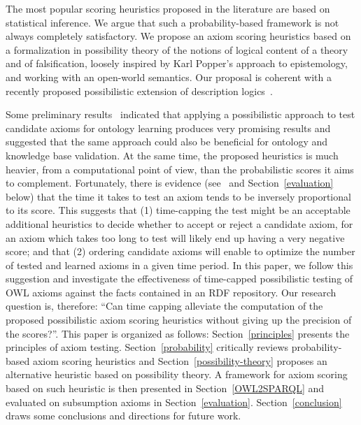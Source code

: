 \documentclass[conference]{IEEEtran}
\begin{document}
The most popular scoring heuristics proposed in the literature are based on statistical inference.
We argue that such a probability-based framework is not always completely satisfactory.
We propose an axiom scoring heuristics based on a formalization in possibility theory of
the notions of logical content of a theory and of falsification, loosely inspired
by Karl Popper's approach to epistemology, and working with an open-world semantics.
Our proposal is coherent with a recently proposed possibilistic extension of
description logics~\cite{QiPanJi2011,QiJiPanDu2010}.

Some preliminary results~\cite{TettamanziFaronZuckerGandon2014ekaw} indicated that
applying a possibilistic approach to test candidate axioms
for ontology learning produces very promising results and suggested that the same approach
could also be beneficial for ontology and knowledge base validation.
At the same time, the proposed heuristics is much heavier, from a computational
point of view, than the probabilistic scores it aims to complement.
Fortunately, there is evidence (see~\cite{TettamanziFaronZuckerGandon2014ekaw} and
Section~\ref{evaluation} below) that the time it takes to test an axiom
tends to be inversely proportional to its score.
This suggests that (1) time-capping the test might be an acceptable additional heuristics
to decide whether to accept or reject a candidate axiom, for an axiom which takes
too long to test will likely end up having a very negative score; and that (2) ordering candidate axioms will enable to optimize the number of tested and learned axioms in a given time period.
In this paper, we follow this suggestion and investigate the effectiveness
of time-capped possibilistic testing of OWL axioms against the facts contained
in an RDF repository.
Our research question is, therefore: ``Can time capping alleviate the computation
of the proposed possibilistic axiom scoring heuristics without giving up
the precision of the scores?''.
This paper is organized as follows: 
Section~\ref{principles} presents the principles of axiom testing.
Section~\ref{probability} critically
reviews probability-based axiom scoring heuristics and Section~\ref{possibility-theory}
proposes an alternative heuristic based on possibility theory.
A framework for axiom scoring based on such heuristic is then presented in
Section~\ref{OWL2SPARQL} and evaluated on subsumption axioms in Section~\ref{evaluation}.
Section~\ref{conclusion} draws some conclusions and directions for future work.

\end{document}
